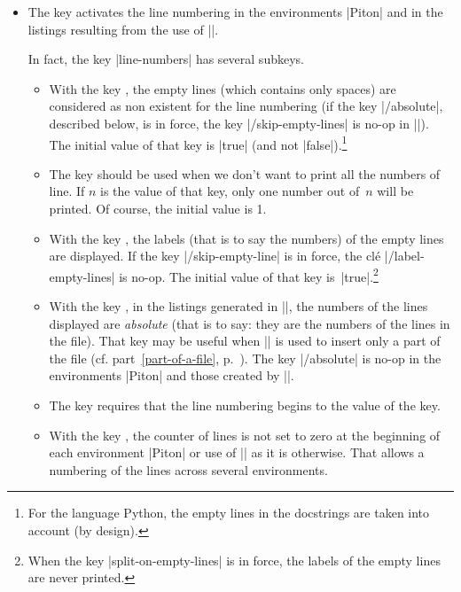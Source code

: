 \documentclass{article}
\begin{document}
\begin{itemize}
\item {} The key  activates the
line numbering in the environments |{Piton}| and in the listings resulting
from the use of |\PitonInputFile|.

In fact, the key |line-numbers| has several subkeys.
\begin{itemize}
\item With the key , the empty lines
(which contains only spaces) are considered as non existent for the line
numbering (if the key |/absolute|, described below, is in force, the key
|/skip-empty-lines| is no-op in |\PitonInputFile|). The initial value of that
key is |true| (and not |false|).\footnote{For the language Python, the empty
lines in the docstrings are taken into account (by design).}

\item The key  should be used when we don't want
to print all the numbers of line. If $n$ is the value of that key, only one
number out of~$n$ will be printed. Of course, the initial value is 1.

\item With the key , the labels
(that is to say the numbers) of the empty lines are displayed. If the key
|/skip-empty-line| is in force, the clé |/label-empty-lines| is no-op. The
initial value of that key is~|true|.\footnote{When the key
|split-on-empty-lines| is in force, the labels of the empty lines are never printed.}

\item With the key , in the listings
generated in |\PitonInputFile|, the numbers of the lines displayed are
\emph{absolute} (that is to say: they are the numbers of the lines in the
file). That key may be useful when |\PitonInputFile| is used to insert only a
part of the file (cf. part~\ref{part-of-a-file}, p.~\pageref{part-of-a-file}).
The key |/absolute| is no-op in the environments |{Piton}| and those created
by |\NewPitonEnvironment|.

\item The key  requires that the line numbering
begins to the value of the key. 

\item With the key , the counter of lines is
not set to zero at the beginning of each environment |{Piton}| or use of
|\PitonInputFile| as it is otherwise. That allows a numbering of the lines
across several environments.


\end{itemize}
\end{itemize}
\end{document}
